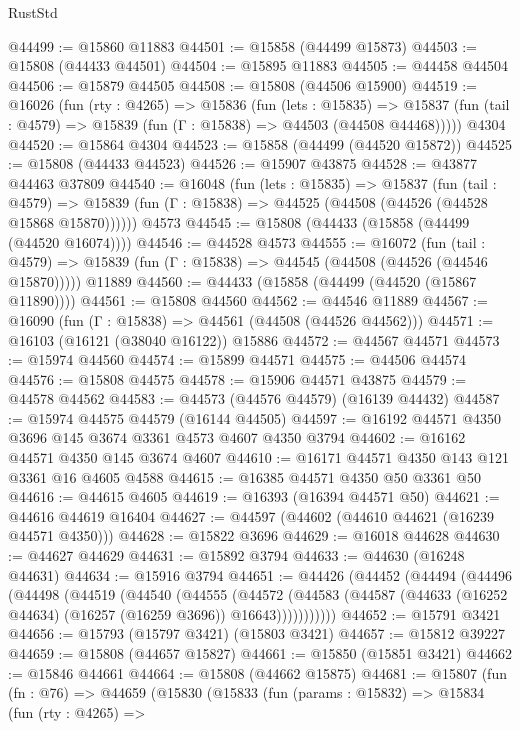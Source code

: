 \begin{lexlean}{RustStd}
\begin{coremodule}
@44499 := @15860 @11883
@44501 := @15858 (@44499 @15873)
@44503 := @15808 (@44433 @44501)
@44504 := @15895 @11883
@44505 := @44458 @44504
@44506 := @15879 @44505
@44508 := @15808 (@44506 @15900)
@44519 := @16026
    (fun (rty : @4265) =>
    @15836
      (fun (lets : @15835) =>
      @15837 (fun (tail : @4579) => @15839 (fun (Γ : @15838) => @44503 (@44508 @44468)))))
    @4304
@44520 := @15864 @4304
@44523 := @15858 (@44499 (@44520 @15872))
@44525 := @15808 (@44433 @44523)
@44526 := @15907 @43875
@44528 := @43877 @44463 @37809
@44540 := @16048
    (fun (lets : @15835) =>
    @15837
      (fun (tail : @4579) =>
      @15839 (fun (Γ : @15838) => @44525 (@44508 (@44526 (@44528 @15868 @15870))))))
    @4573
@44545 := @15808 (@44433 (@15858 (@44499 (@44520 @16074))))
@44546 := @44528 @4573
@44555 := @16072
    (fun (tail : @4579) => @15839 (fun (Γ : @15838) => @44545 (@44508 (@44526 (@44546 @15870)))))
    @11889
@44560 := @44433 (@15858 (@44499 (@44520 (@15867 @11890))))
@44561 := @15808 @44560
@44562 := @44546 @11889
@44567 := @16090 (fun (Γ : @15838) => @44561 (@44508 (@44526 @44562)))
@44571 := @16103 (@16121 (@38040 @16122)) @15886
@44572 := @44567 @44571
@44573 := @15974 @44560
@44574 := @15899 @44571
@44575 := @44506 @44574
@44576 := @15808 @44575
@44578 := @15906 @44571 @43875
@44579 := @44578 @44562
@44583 := @44573 (@44576 @44579) (@16139 @44432)
@44587 := @15974 @44575 @44579 (@16144 @44505)
@44597 := @16192 @44571 @4350 @3696 @145 @3674 @3361 @4573 @4607 @4350 @3794
@44602 := @16162 @44571 @4350 @145 @3674 @4607
@44610 := @16171 @44571 @4350 @143 @121 @3361 @16 @4605 @4588
@44615 := @16385 @44571 @4350 @50 @3361 @50
@44616 := @44615 @4605
@44619 := @16393 (@16394 @44571 @50)
@44621 := @44616 @44619 @16404
@44627 := @44597 (@44602 (@44610 @44621 (@16239 @44571 @4350)))
@44628 := @15822 @3696
@44629 := @16018 @44628
@44630 := @44627 @44629
@44631 := @15892 @3794
@44633 := @44630 (@16248 @44631)
@44634 := @15916 @3794
@44651 := @44426
    (@44452
      (@44494
        (@44496
          (@44498
            (@44519
              (@44540
                (@44555
                  (@44572
                    (@44583
                      (@44587 (@44633 (@16252 @44634) (@16257 (@16259 @3696)) @16643)))))))))))
@44652 := @15791 @3421
@44656 := @15793 (@15797 @3421) (@15803 @3421)
@44657 := @15812 @39227
@44659 := @15808 (@44657 @15827)
@44661 := @15850 (@15851 @3421)
@44662 := @15846 @44661
@44664 := @15808 (@44662 @15875)
@44681 := @15807
    (fun (fn : @76) =>
    @44659
      (@15830
        (@15833
          (fun (params : @15832) =>
          @15834
            (fun (rty : @4265) =>

\end{coremodule}
\end{lexlean}
